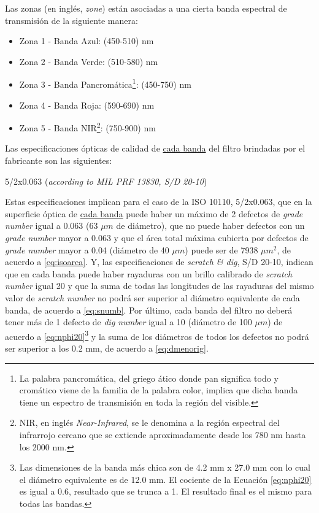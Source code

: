 Las zonas (en inglés, \textit{zone}) están asociadas a una cierta banda espectral de transmisión de la siguiente manera:
\begin{itemize}
\justifying
\item Zona 1 - Banda Azul: (450-510) nm
\item Zona 2 - Banda Verde: (510-580) nm
\item Zona 3 - Banda Pancromática\footnote{La palabra pancromática, del griego ático donde pan significa todo y cromático viene de la familia de la palabra color, implica que dicha banda tiene un espectro de transmisión en toda la región del visible.}: (450-750) nm
\item Zona 4 - Banda Roja: (590-690) nm
\item Zona 5 - Banda NIR\footnote{NIR, en inglés \textit{Near-Infrared}, se le denomina a la región espectral del infrarrojo cercano que se extiende aproximadamente desde los 780 nm hasta los 2000 nm.}: (750-900) nm
\end{itemize}
 \hspace{0.5cm}Las especificaciones ópticas de calidad de \underline{cada banda} del filtro brindadas por el fabricante son las siguientes:
\begin{center}
5/2x0.063 (\textit{according to MIL PRF 13830, S/D 20-10})
\end{center}
\hspace{0.5cm}Estas especificaciones implican para el caso de la ISO 10110, 5/2x0.063, que en la superficie óptica de \underline{cada banda} puede haber un máximo de 2 defectos de \textit{grade number} igual a 0.063 (63 $\mu m$ de diámetro), que no puede haber defectos con un \textit{grade number} mayor a 0.063 y que el área total máxima cubierta por defectos de \textit{grade number} mayor a 0.04 (diámetro de 40 $\mu m$) puede ser de 7938 $\mu m^{2}$, de acuerdo a \ref{eq:isoarea}. Y, las especificaciones de \textit{scratch \& dig}, S/D 20-10, indican que en cada banda puede haber rayaduras con un brillo calibrado de \textit{scratch number} igual 20 y que la suma de todas las longitudes de las rayaduras del mismo valor de \textit{scratch number} no podrá ser superior al diámetro equivalente de cada banda, de acuerdo a \ref{eq:snumb}. Por último, cada banda del filtro no deberá tener más de 1 defecto de \textit{dig number} igual a 10 (diámetro de 100 $\mu m$)  de acuerdo a \ref{eq:nphi20}\footnote{Las dimensiones de la banda más chica son de 4.2 mm x 27.0 mm con lo cual el diámetro equivalente es de 12.0 mm. El cociente de la Ecuación \ref{eq:nphi20} es igual a 0.6, resultado que se trunca a 1. El resultado final es el mismo para todas las bandas.}  y la suma de los diámetros de todos los defectos no podrá ser superior a los 0.2 mm, de acuerdo a \ref{eq:dmenorig}. 

